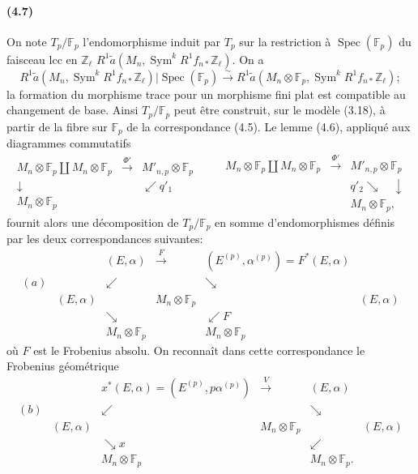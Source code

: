 \documentclass[10pt]{article}
\newcommand{\Z}{\mathbb Z}
\newcommand{\Sym}{\operatorname{Sym}}
\newcommand{\Spec}{\operatorname{Spec}}
\newcommand{\F}{\mathbb F}
\begin{document}
\paragraph{(4.7)}
On note $T_p/\F_p$ l'endomorphisme induit par $T_p$ sur la restriction à $\Spec(\F_p)$ du faisceau lcc en $\Z_\ell$ $R^1\widetilde a(M_n,\Sym^kR^1f_{n*}\Z_\ell)$. On a
\[
R^1\widetilde a(M_n,\Sym^kR^1f_{n*}\Z_\ell)|\Spec(\F_p)
\xrightarrow{\sim}
R^1\widetilde a(M_n\otimes\F_p,\Sym^kR^1f_{n*}\Z_\ell);
\]
la formation du morphisme trace pour un morphisme fini plat est compatible au changement de base. Ainsi $T_p/\F_p$ peut être construit, sur le modèle (3.18), à partir de la fibre sur $\F_p$ de la correspondance (4.5). Le lemme (4.6), appliqué aux diagrammes commutatifs
\[
\begin{array}{ccc}
M_n\otimes\F_p\coprod M_n\otimes\F_p&\xrightarrow{\Phi'}&M'_{n,p}\otimes\F_p\\
\downarrow&&\swarrow q'_1\\
M_n\otimes\F_p&&
\end{array}
\qquad
\begin{array}{ccc}
M_n\otimes\F_p\coprod M_n\otimes\F_p&\xrightarrow{\Phi'}&M'_{n,p}\otimes\F_p\\
&&q'_2\searrow\quad\downarrow\\
&&M_n\otimes\F_p,
\end{array}
\]
fournit alors une décomposition de $T_p/\F_p$ en somme d'endomorphismes définis par les deux correspondances suivantes:
\[
\begin{array}{cccccc}
&& (E,\alpha)&\xrightarrow{F}&(E^{(p)},\alpha^{(p)})=F^*(E,\alpha)\\[-0.2em]
(a)&& \swarrow && \searrow\\[-0.2em]
& (E,\alpha) && M_n\otimes\F_p && (E,\alpha)\\[-0.2em]
&& \searrow && \swarrow F\\[-0.2em]
&& M_n\otimes\F_p && M_n\otimes\F_p
\end{array}
\]
où $F$ est le Frobenius absolu. On reconnaît dans cette correspondance le Frobenius géométrique
\[
\begin{array}{cccccc}
&&x^*(E,\alpha)=(E^{(p)},p\alpha^{(p)})&\xrightarrow{\ V\ }&(E,\alpha)\\[-0.2em]
(b)&& \swarrow && \searrow\\[-0.2em]
& (E,\alpha) && M_n\otimes\F_p && (E,\alpha)\\[-0.2em]
&& \searrow x && \swarrow\\[-0.2em]
&& M_n\otimes\F_p && M_n\otimes\F_p.
\end{array}
\]
\end{document}
